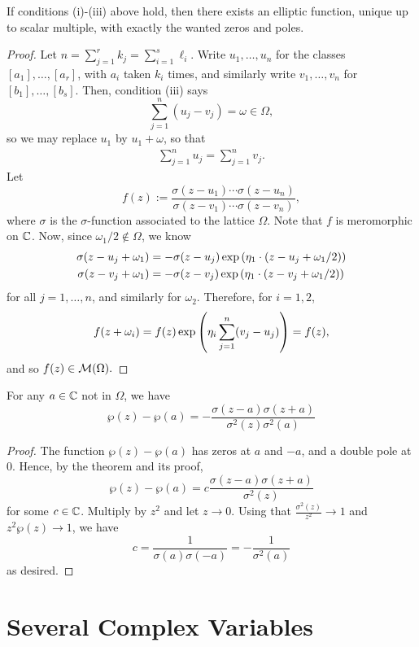 \documentclass[11pt]{article}
\begin{document}
\begin{thm}
    If conditions (i)-(iii) above hold, then there exists an elliptic function, unique up to scalar multiple, with exactly the wanted zeros and poles.
\end{thm}

\begin{proof}
    Let $n = \sum_{j=1}^rk_j=\sum_{i=1}^s\ell_i$. Write $u_1,\dots,u_n$ for the classes $[a_1],\dots,[a_r]$, with $a_i$ taken $k_i$ times, and similarly write $v_1,\dots,v_n$ for $[b_1],\dots,[b_s]$. Then, condition (iii) says
    $$\sum_{j=1}^n(u_j-v_j) = \omega \in \Omega,$$
    so we may replace $u_1$ by $u_1+\omega$, so that
    \begin{align*}
        \sum_{j=1}^nu_j=\sum_{j=1}^nv_j.
    \end{align*}
    Let
    $$f(z) := \frac{\sigma(z-u_1)\cdots \sigma(z-u_n)}{\sigma(z-v_1)\cdots \sigma(z-v_n)},$$
    where $\sigma$ is the $\sigma$-function associated to the lattice $\Omega$. Note that $f$ is meromorphic on $\mathbb{C}$. Now, since $\omega_1/2 \not \in \Omega$, we know
    \begin{align*}
       \sigma(z-u_j+\omega_1) &= -\sigma(z-u_j)\exp\left (  \eta_1\cdot (z-u_j+\omega_1/2 ) \right )
       \\ \sigma(z-v_j+\omega_1) &= -\sigma(z-v_j)\exp\left (  \eta_1\cdot (z-v_j+\omega_1/2 ) \right )
    \end{align*}
    for all $j=1,\dots,n$, and similarly for $\omega_2$. Therefore, for $i=1,2$,
    $$f(z+\omega_i) = f(z)\exp \left ( \eta_i \sum_{j=1}^n(v_j-u_j) \right )=f(z),$$
    and so $f(z) \in \mathcal M(\Omega).$
\end{proof}

\begin{cor}
    For any $a \in \mathbb{C}$ not in $\Omega$, we have
    $$\wp(z)-\wp(a) = -\frac{\sigma(z-a)\sigma(z+a)}{\sigma^2(z)\sigma^2(a)}$$
\end{cor}

\begin{proof}
    The function $\wp(z)-\wp(a)$ has zeros at $a$ and $-a$, and a double pole at $0$. Hence, by the theorem and its proof,
    $$\wp(z)-\wp(a) = c\frac{\sigma(z-a)\sigma(z+a)}{\sigma^2(z)}$$
    for some $c \in \mathbb{C}$. Multiply by $z^2$ and let $z \to 0$. Using that $\frac{\sigma^2(z)}{z^2}\to 1$ and $z^2\wp(z) \to 1$, we have
    $$c = \frac{1}{\sigma(a)\sigma(-a)}=-\frac{1}{\sigma^2(a)}$$
    as desired.
\end{proof}

\section{Several Complex Variables}
\end{document}
